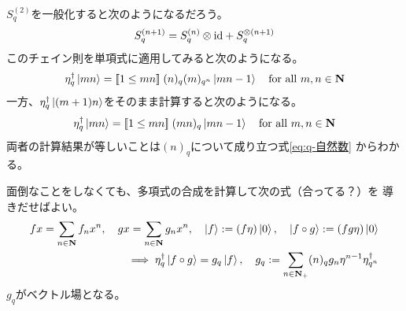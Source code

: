 {	$S_q^{(2)}$を一般化すると次のようになるだろう。
	\begin{equation*}\begin{split}
		S_q^{(n+1)} = S_q^{(n)}\otimes{\ensuremath{\operatorname{id}}} + S_q^{\otimes(n+1)}
	\end{split}\end{equation*}
	このチェイン則を単項式に適用してみると次のようになる。
	\begin{equation*}\begin{split}
		\eta_q^\dag\mathinner{|{mn}\rangle} = [\![1\le mn]\!]\;(n)_q(m)_{q^n}\mathinner{|{mn-1}\rangle}
		\quad\text{for all } m,n\in\mathbf{N}
	\end{split}\end{equation*}
	一方、$\eta_q^\dag\mathinner{|{(m+1)n}\rangle}$をそのまま計算すると次のようになる。
	\begin{equation*}\begin{split}
		\eta_q^\dag\mathinner{|{mn}\rangle} = [\![1\le mn]\!]\;(mn)_q\mathinner{|{mn-1}\rangle}
		\quad\text{for all } m,n\in\mathbf{N}
	\end{split}\end{equation*}
	両者の計算結果が等しいことは$(n)_q$について成り立つ式\eqref{eq:q-自然数}
	からわかる。

	面倒なことをしなくても、多項式の合成を計算して次の式（合ってる？）を
	導きだせばよい。
	\begin{equation*}\begin{split}
		fx = \sum_{n\in\mathbf{N}} f_nx^n,\quad gx = \sum_{n\in\mathbf{N}} g_nx^n
		,\quad \mathinner{|{f}\rangle} := (f\eta)\mathinner{|{0}\rangle}
		,\quad \mathinner{|{f\circ g}\rangle} := (fg\eta)\mathinner{|{0}\rangle} \\
		\implies \eta_q^\dag\mathinner{|{f\circ g}\rangle}
		= g_q\mathinner{|{f}\rangle},\quad g_q := \sum_{n\in\mathbf{N}_+} 
		(n)_qg_{n}\eta^{n-1}\eta_{q^n}^\dag
	\end{split}\end{equation*}
	$g_q$がベクトル場となる。

}

